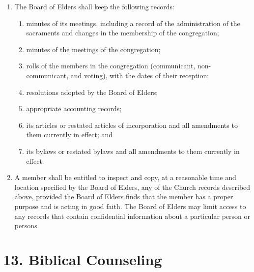 \documentclass[
]{book}
\providecommand{\tightlist}{%
  \setlength{\itemsep}{0pt}\setlength{\parskip}{0pt}}
\begin{document}
\begin{enumerate}
\def\labelenumi{\alph{enumi}.}
\tightlist
\item
  The Board of Elders shall keep the following records:

  \begin{enumerate}
  \def\labelenumii{(\arabic{enumii})}
  \tightlist
  \item
    minutes of its meetings, including a record of the administration of the sacraments and changes in the membership of the congregation;
  \item
    minutes of the meetings of the congregation;
  \item
    rolls of the members in the congregation (communicant, non-communicant, and voting), with the dates of their reception;
  \item
    resolutions adopted by the Board of Elders;
  \item
    appropriate accounting records;
  \item
    its articles or restated articles of incorporation and all amendments to them currently in effect; and
  \item
    its bylaws or restated bylaws and all amendments to them currently in effect.
  \end{enumerate}
\item
  A member shall be entitled to inspect and copy, at a reasonable time and location specified by the Board of Elders, any of the Church records described above, provided the Board of Elders finds that the member has a proper purpose and is acting in good faith. The Board of Elders may limit access to any records that contain confidential information about a particular person or persons.
\end{enumerate}

\hypertarget{biblical-counseling}{%
\section*{13. Biblical Counseling}\label{biblical-counseling}}
\end{document}
